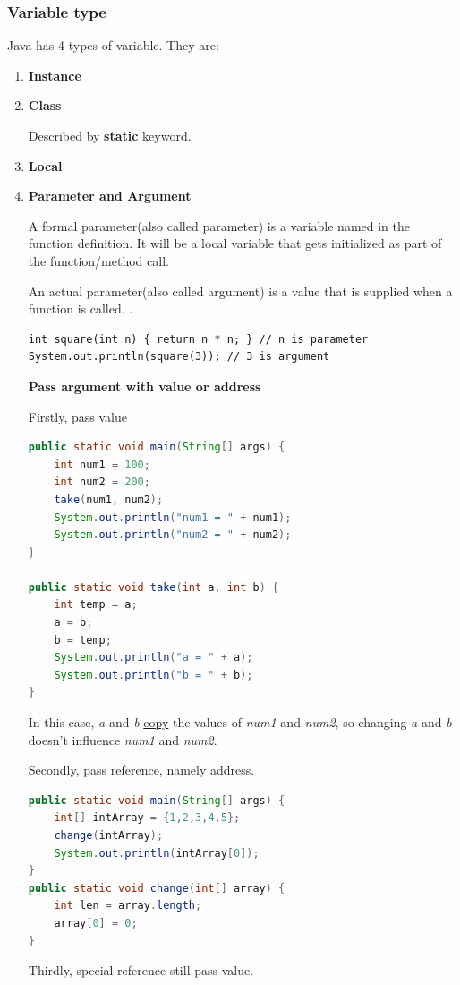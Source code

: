 \documentclass[12pt, a4paper]{report}
\begin{document}
    \subsubsection{Variable type}
    Java has 4 types of variable. They are:
    \begin{enumerate}
        \item \textbf{Instance}
        \item \textbf{Class} \par 
        Described by \textbf{static} keyword. 
        \item \textbf{Local}
        \item \textbf{Parameter and Argument} \par 
        A formal parameter(also called parameter) is a variable named in the function definition. It will be a local variable that gets initialized as part of the function/method call. \par 
        An actual parameter(also called argument) is a value that is supplied when a function is called. \citep{javaParameter}.
        \begin{lstlisting}
int square(int n) { return n * n; } // n is parameter
System.out.println(square(3)); // 3 is argument
        \end{lstlisting}
        \textbf{Pass argument with value or address} \par 
        Firstly, pass value
        \begin{lstlisting}[language=Java]
public static void main(String[] args) {
    int num1 = 100;
    int num2 = 200;
    take(num1, num2);
    System.out.println("num1 = " + num1);
    System.out.println("num2 = " + num2);
}

public static void take(int a, int b) {
    int temp = a;
    a = b;
    b = temp;
    System.out.println("a = " + a);
    System.out.println("b = " + b);
}
        \end{lstlisting}
        In this case, \emph{a} and \emph{b} \underline{copy} the values of \emph{num1} and \emph{num2}, so changing \emph{a} and \emph{b} doesn't influence \emph{num1} and \emph{num2}.  \par 
        Secondly, pass reference, namely address. 
        \begin{lstlisting}[language=Java]
public static void main(String[] args) {
    int[] intArray = {1,2,3,4,5};
    change(intArray);
    System.out.println(intArray[0]);
}
public static void change(int[] array) {
    int len = array.length;
    array[0] = 0;
}
        \end{lstlisting}
    
        Thirdly, special reference still pass value. 

    \end{enumerate}
    
\end{document}
